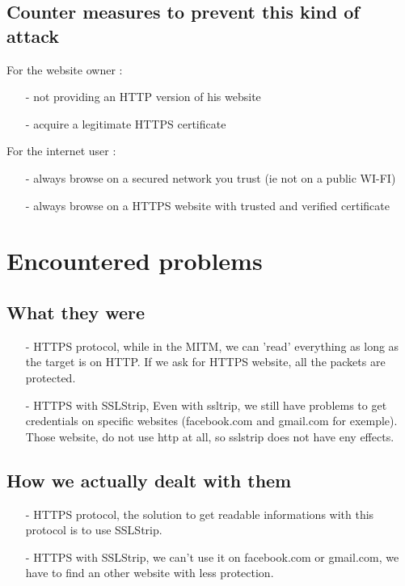 \documentclass[a4paper, 11pt, oneside]{article}
\begin{document}
\subsection{Counter measures to prevent this kind of attack}
For the website owner : \\
\begin{itemize}
    \item[-] not providing an HTTP version of his website\\
    \item[-] acquire a legitimate HTTPS certificate\\
\end{itemize}

For the internet user : \\
\begin{itemize}
    \item[-] always browse on a secured network you trust (ie not on a public WI-FI)\\
    \item[-] always browse on a HTTPS website with trusted and verified certificate\\
\end{itemize}

\section{Encountered problems}

\subsection{What they were}
\begin{itemize}
    \item[-] HTTPS protocol, while in the MITM, we can 'read' everything as long as the target is on HTTP. If we ask for HTTPS website, all the packets are protected. \\
    \item[-] HTTPS with SSLStrip, Even with ssltrip, we still have problems to get credentials on specific websites (facebook.com and gmail.com for exemple). Those website, do not use http at all, so sslstrip does not have eny effects.\\
\end{itemize}

\subsection{How we actually dealt with them}
\begin{itemize}
    \item[-] HTTPS protocol, the solution to get readable informations with this protocol is to use SSLStrip.\\
    \item[-] HTTPS with SSLStrip, we can't use it on facebook.com or gmail.com, we have to find an other website with less protection.\\
\end{itemize}
    
\end{document}
